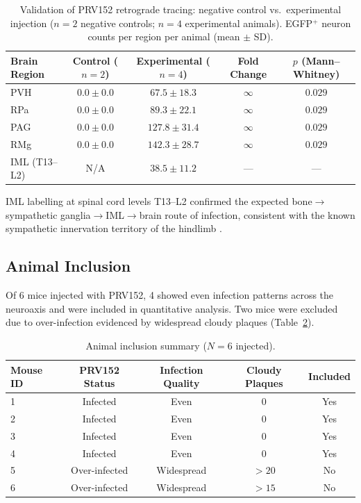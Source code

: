 \documentclass[11pt]{article}
\begin{document}
\begin{table}[H]
\centering
\caption{Validation of PRV152 retrograde tracing: negative control vs.\ experimental injection ($n = 2$ negative controls; $n = 4$ experimental animals). EGFP$^+$ neuron counts per region per animal (mean $\pm$ SD).}
\label{tab:validation}
\begin{tabular}{lcccc}
\toprule
Brain Region & Control ($n = 2$) & Experimental ($n = 4$) & Fold Change & $p$ (Mann--Whitney) \\
\midrule
PVH & $0.0 \pm 0.0$ & $67.5 \pm 18.3$ & $\infty$ & $0.029$ \\
RPa & $0.0 \pm 0.0$ & $89.3 \pm 22.1$ & $\infty$ & $0.029$ \\
PAG & $0.0 \pm 0.0$ & $127.8 \pm 31.4$ & $\infty$ & $0.029$ \\
RMg & $0.0 \pm 0.0$ & $142.3 \pm 28.7$ & $\infty$ & $0.029$ \\
IML (T13--L2) & N/A & $38.5 \pm 11.2$ & --- & --- \\
\bottomrule
\end{tabular}
\end{table}

IML labelling at spinal cord levels T13--L2 confirmed the expected bone$\to$sympathetic ganglia$\to$IML$\to$brain route of infection, consistent with the known sympathetic innervation territory of the hindlimb \citep{saper2002central}.

\subsection{Animal Inclusion}

Of 6 mice injected with PRV152, 4 showed even infection patterns across the neuroaxis and were included in quantitative analysis. Two mice were excluded due to over-infection evidenced by widespread cloudy plaques (Table~\ref{tab:animals}).

\begin{table}[H]
\centering
\caption{Animal inclusion summary ($N = 6$ injected).}
\label{tab:animals}
\begin{tabular}{lcccc}
\toprule
Mouse ID & PRV152 Status & Infection Quality & Cloudy Plaques & Included \\
\midrule
1 & Infected & Even & $0$ & Yes \\
2 & Infected & Even & $0$ & Yes \\
3 & Infected & Even & $0$ & Yes \\
4 & Infected & Even & $0$ & Yes \\
5 & Over-infected & Widespread & $>20$ & No \\
6 & Over-infected & Widespread & $>15$ & No \\
\bottomrule
\end{tabular}
\end{table}
\end{document}
